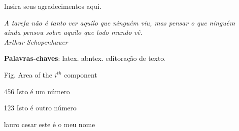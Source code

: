 \documentclass[
	12pt,				%
    oneside,			%
	a4paper,			%
	english,			%
	french,				%
	spanish,			%
	brazil,				%
	]{abntex2}
\begin{document}
\frenchspacing 


\imprimircapa

\imprimirfolhaderosto*






\begin{agradecimentos}
Insira seus agradecimentos aqui.
\end{agradecimentos}

\vspace*{\fill}
{ \raggedleft
	\textit{A tarefa não é tanto ver aquilo que ninguém viu, mas pensar o que ninguém ainda pensou sobre aquilo que todo mundo vê. \\
		Arthur Schopenhauer}
	~
}
\pagebreak



\begin{resumo} %
 

 

 \vspace{\onelineskip}
    
 \noindent
 \textbf{Palavras-chaves}: latex. abntex. editoração de texto.
\end{resumo} %


\begin{resumo}[Abstract]

  
    
\end{resumo}



\listoffigures* %
\cleardoublepage %


\listoftables*
\cleardoublepage

\begin{siglas}
  \item[Fig.] Area of the $i^{th}$ component
  \item[456] Isto é um número
  \item[123] Isto é outro número
  \item[lauro cesar] este é o meu nome
\end{siglas}
\end{document}
